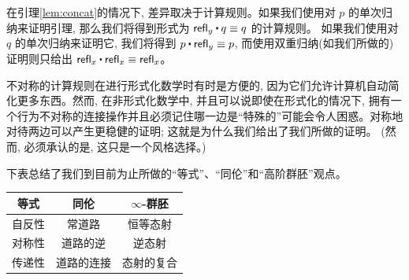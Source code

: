 在引理\ref{lem:concat}的情况下, 差异取决于计算规则。如果我们使用对 $p$ 的单次归纳来证明引理, 那么我们将得到形式为 $\refl{y} \ct q \jdeq q$ 的计算规则。
如果我们使用对 $q$ 的单次归纳来证明它, 我们将得到 $p\ct\refl{y}\jdeq p$, 而使用双重归纳(如我们所做的)证明则只给出 $\refl{x}\ct\refl{x} \jdeq \refl{x}$。

%
不对称的计算规则在进行形式化数学时有时是方便的, 因为它们允许计算机自动简化更多东西。然而, 在非形式化数学中, 并且可以说即使在形式化的情况下, 
拥有一个行为不对称的连接操作并且必须记住哪一边是``特殊的''可能会令人困惑。对称地对待两边可以产生更稳健的证明; 这就是为什么我们给出了我们所做的证明。
(然而, 必须承认的是, 这只是一个风格选择。)


下表总结了我们到目前为止所做的``等式''、``同伦''和``高阶群胚''观点。
\begin{center}
  \medskip
  \begin{tabular}{ccc}
    \toprule
    等式 & 同伦 & $\infty$-群胚\\
    \midrule
    自反性\index{equality!reflexivity of} & 常道路 & 恒等态射\\
    对称性\index{equality!symmetry of} & 道路的逆 & 逆态射\\
    传递性\index{equality!transitivity of} & 道路的连接 & 态射的复合\\
    \bottomrule
  \end{tabular}
  \medskip
\end{center}

